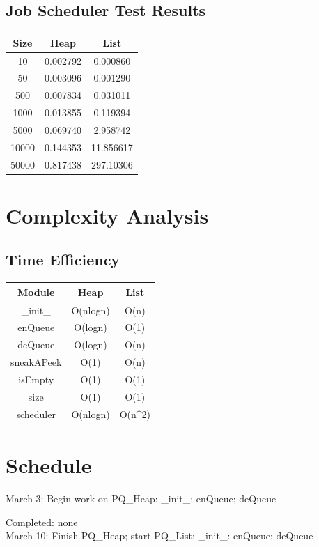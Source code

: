 \documentclass{article}
\begin{document}
\subsection{Job Scheduler Test Results}
\begin{table}[H]
    \begin{tabular}{c c c}
        Size & Heap & List \\ \hline
        10 & 0.002792 & 0.000860 \\ 
        50 & 0.003096 & 0.001290 \\
        500 & 0.007834 & 0.031011 \\
        1000 & 0.013855 & 0.119394 \\
        5000 & 0.069740 & 2.958742 \\
        10000 & 0.144353 & 11.856617 \\
        50000 & 0.817438 & 297.10306
    \end{tabular}
\end{table}

\newpage
\section{Complexity Analysis}
\subsection{Time Efficiency}
\begin{table}[H]
    \begin{tabular}{c c c}
        Module & Heap & List \\ \hline
        \_init\_ & O(nlogn) & O(n) \\ 
        enQueue & O(logn) & O(1) \\
        deQueue & O(logn) & O(n) \\
        sneakAPeek & O(1) & O(n) \\
        isEmpty & O(1) & O(1) \\
        size & O(1) & O(1) \\
        scheduler & O(nlogn) & O(n^2)
    \end{tabular}
\end{table}

\newpage
\section{Schedule}
March 3: Begin work on PQ\_Heap: \_init\_; enQueue; deQueue

Completed: none\\
March 10: Finish PQ\_Heap; start PQ\_List: \_init\_: enQueue; deQueue
\end{document}
